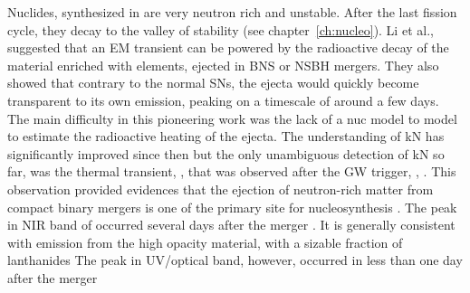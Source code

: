 Nuclides, synthesized in \rproc{} are very neutron rich and unstable. After the last 
fission cycle, they decay to the valley of stability (see chapter~\ref{ch:nucleo}). 
%
%
%
Li et al., \citep{Li:1998bw} suggested that an \ac{EM} transient can be powered by the radioactive 
decay of the material enriched with \rproc{} elements, ejected in \ac{BNS} or \ac{NSBH} mergers. 
They also showed that contrary to the normal \acp{SN}, the ejecta would quickly become transparent 
to its own emission, peaking on a timescale of around a few days. The main difficulty in this 
pioneering work was the lack of a \ac{nuc} model to model to estimate the radioactive heating of the 
ejecta. 
%
The understanding of \ac{kN} has significantly improved since then
\citep[\eg][]{Kulkarni:2005jw,Metzger:2010,Roberts:2011,Metzger:2016pju,Wollaeger:2017ahm}
%
but the only unambiguous detection of \ac{kN} so far, was the thermal transient, \AT{}, 
\citep{Coulter:2017wya,Chornock:2017sdf,Nicholl:2017ahq,Cowperthwaite:2017dyu,Tanvir:2017pws,Tanaka:2017qxj}
that was observed after the \ac{GW} trigger, \GW{}, 
\citep{TheLIGOScientific:2017qsa,Abbott:2018wiz,LIGOScientific:2018mvr}.
%
This observation provided evidences that the ejection of neutron-rich matter from compact 
binary mergers is one of the primary site for \rproc{} nucleosynthesis 
\citep{Arcavi:2017xiz,Coulter:2017wya,Drout:2017ijr,Evans:2017mmy,Hallinan:2017woc,Kasliwal:2017ngb,
    Nicholl:2017ahq,Smartt:2017fuw,Soares-santos:2017lru,Tanvir:2017pws,
    Troja:2017nqp,Mooley:2018dlz,Ruan:2017bha,Lyman:2018qjg}. 
%
The peak in \ac{NIR} band of \AT{} occurred several days after the merger \citep{Chornock:2017sdf}.
It is generally consistent with emission from the high opacity material, with a sizable 
fraction of lanthanides \citep{Kasen:2013xka}
%
The peak in \ac{UV}/optical band, however, occurred in less than one day after the merger 
